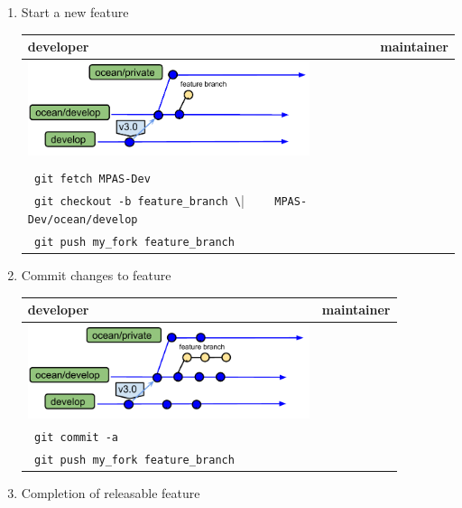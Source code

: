 \documentclass[11pt]{article}
\begin{document}
\begin{enumerate}
\item Start a new feature

 \begin{tabular}[c]{L{3.3in}|L{3.3in}}
developer & maintainer \\
\hline
\includegraphics[width=3.25in]{f/MPASworkflow_1.pdf} \\
\\
\verb| git fetch MPAS-Dev| \\
\verb| git checkout -b feature_branch \|
\verb|    MPAS-Dev/ocean/develop | \\
\verb| git push my_fork feature_branch|  & 
 \end{tabular}
\item Commit changes to feature 

 \begin{tabular}[c]{L{3.3in}|L{3.3in}}
developer & maintainer \\
\hline
\includegraphics[width=3.25in]{f/MPASworkflow_2.pdf} \\
\verb| git commit -a|  \\
\verb| git push my_fork feature_branch|  
 \end{tabular}

\clearpage
\item Completion of releasable feature


\end{enumerate}
\end{document}

